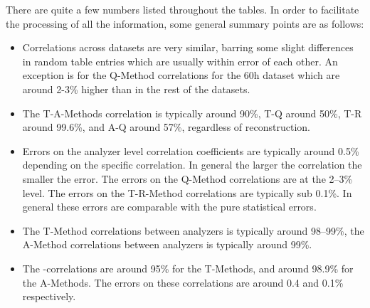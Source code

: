 There are quite a few numbers listed throughout the tables. In order to facilitate the processing of all the information, some general summary points are as follows: 
\begin{itemize}
	\item{Correlations across datasets are very similar, barring some slight differences in random table entries which are usually within error of each other. An exception is for the Q-Method correlations for the 60h dataset which are around 2-3\% higher than in the rest of the datasets.}
	\item{The T-A-Methods correlation is typically around 90\%, T-Q around 50\%, T-R around 99.6\%, and A-Q around 57\%, regardless of reconstruction. }
	\item{Errors on the analyzer level correlation coefficients are typically around 0.5\% depending on the specific correlation. In general the larger the correlation the smaller the error. The errors on the Q-Method correlations are at the 2--3\% level. The errors on the T-R-Method correlations are typically sub 0.1\%. In general these errors are comparable with the pure statistical errors.}
	\item{The T-Method correlations between \RW analyzers is typically around 98--99\%, the A-Method correlations between \RW analyzers is typically around 99\%.}
	\item{The \RE-\RW correlations are around 95\% for the T-Methods, and around 98.9\% for the A-Methods. The errors on these correlations are around 0.4 and 0.1\% respectively.}
\end{itemize}




